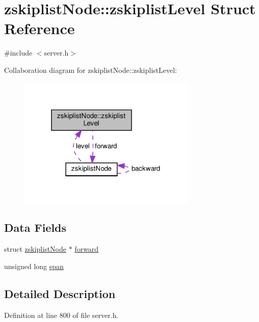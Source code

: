 \hypertarget{structzskiplist_node_1_1zskiplist_level}{}\section{zskiplist\+Node\+:\+:zskiplist\+Level Struct Reference}
\label{structzskiplist_node_1_1zskiplist_level}


{\ttfamily \#include $<$server.\+h$>$}



Collaboration diagram for zskiplist\+Node\+:\+:zskiplist\+Level\+:
\nopagebreak
\begin{figure}[H]
\begin{center}
\leavevmode
\includegraphics[width=241pt]{structzskiplist_node_1_1zskiplist_level__coll__graph}
\end{center}
\end{figure}
\subsection*{Data Fields}
\begin{DoxyCompactItemize}
\item 
struct \hyperlink{structzskiplist_node}{zskiplist\+Node} $\ast$ \hyperlink{structzskiplist_node_1_1zskiplist_level_aaa7319c399716d20dfa04890a648f04a}{forward}
\item 
unsigned long \hyperlink{structzskiplist_node_1_1zskiplist_level_aa64c686737f5669a58d0d14c82d6d123}{span}
\end{DoxyCompactItemize}


\subsection{Detailed Description}


Definition at line 800 of file server.\+h.



